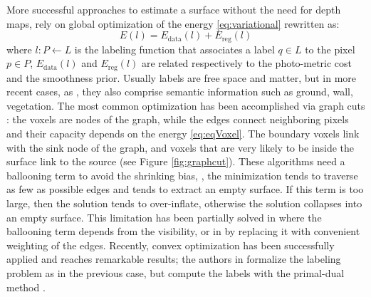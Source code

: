 More successful approaches to estimate a surface without the need for depth maps, rely on global optimization of the energy \eqref{eq:variational} rewritten as:
\begin{equation}
\label{eq:eqVoxel}
E(\mathit{l}) = E_{\text{data}}(\mathit{l}) + E_{\text{reg}} (\mathit{l})  
\end{equation}
where $\mathit{l}:\mathit{P}\leftarrow \mathit{L}$ is the labeling function that associates a label $q\in \mathit{L}$ to the pixel $p \in\mathit{P}$, $E_{\text{data}}(\mathit{l})$ and $E_{\text{reg}} (\mathit{l})$ are related respectively to the photo-metric cost and the smoothness prior. Usually labels are free space and matter, but in more recent cases, as \cite{savinov2016semantic}, they also comprise semantic information such as ground, wall, vegetation.
The most common optimization has been accomplished via graph cuts \cite{vogiatzis2005multi,kolmogorov2002multi,hornung2006hierarchical,furukawa2006carved,mucke2011surface,hernandez2007probabilistic}: the voxels are nodes of the graph, while the edges connect neighboring pixels and their capacity depends on the energy \eqref{eq:eqVoxel}. The boundary voxels link with the sink node of the graph, and voxels that are very likely to be inside the surface link to the source (see Figure \ref{fig:graphcut}).
These algorithms need a ballooning term to avoid the shrinking bias, \ie, the minimization tends to traverse as few as possible edges and tends to extract an empty surface. If this term is too large, then the solution tends to over-inflate, otherwise the solution collapses into an empty surface.
This limitation has been partially solved in \cite{hernandez2007probabilistic} where the ballooning term depends  from the visibility, or in \cite{mucke2011surface} by replacing it with convenient weighting of the edges. 
Recently, convex optimization has  been successfully applied and reaches remarkable results; the authors in 
\cite{kolev2009continuous,kolev2010anisotropic,kostrikov2014probabilistic,savinov2016semantic} formalize the labeling problem as in the previous case, but compute the labels with the primal-dual method \cite{mehrotra1992implementation}.




